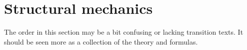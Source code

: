 %
%
%

\section{Structural mechanics}
The order in this section may be a bit confusing or lacking transition texts. It should be seen more as a collection of the theory and formulas.

